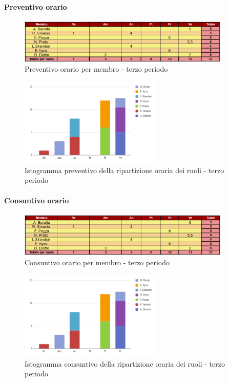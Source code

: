 \paragraph{Preventivo orario} \hspace{1pt}

\begin{figure}[H]
    \centering
    \includegraphics[width=0.9\textwidth]{../Images/preventivoOrario3Periodo.png}
    \caption{Preventivo orario per membro - terzo periodo}
    \label{fig:Preventivo_orario_3}
\end{figure}

\begin{figure}[H]
    \centering
    \includegraphics[width=0.6\textwidth]{../Images/preventivoDivisioneRuoli3Periodo.png}
    \caption{Istogramma preventivo della ripartizione oraria dei ruoli - terzo periodo}
    \label{fig:Preventivo_ripartizione_oraria_3}
\end{figure}

\paragraph{Consuntivo orario } \hspace{1pt}

\begin{figure}[H]
    \centering
    \includegraphics[width=0.9\textwidth]{../Images/consuntivoOrario3Periodo.png}
    \caption{Consuntivo orario per membro - terzo periodo}
    \label{fig:Constuntivo_orario_3}
\end{figure}

\begin{figure}[H]
    \centering
    \includegraphics[width=0.6\textwidth]{../Images/consuntivoDivisioneRuoli3Periodo.png}
    \caption{Istogramma consuntivo della ripartizione oraria dei ruoli - terzo periodo}
    \label{fig:Consuntivo_ripartizione_oraria_3}
\end{figure}
